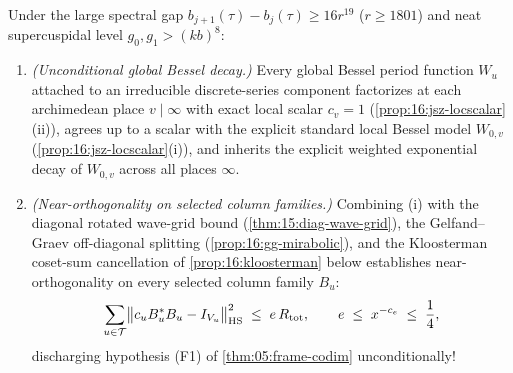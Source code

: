 \begin{theorem}
\label{thm:16:offdiag-near-orth}
Under the large spectral gap $b_{j+1}(\tau) - b_j(\tau) \ge 16 r^{19}$ ($r \ge 1801$) and neat supercuspidal level $g_0, g_1 > (k b)^8$:
\begin{enumerate}[label=\textup{(\roman*)}]
\item \emph{(Unconditional global Bessel decay.)} Every global Bessel period function $W_u$ attached to an irreducible discrete-series component factorizes at each archimedean place $v \mid \infty$ with exact local scalar $c_v = 1$ (\cref{prop:16:jsz-locscalar}(ii)), agrees up to a scalar with the explicit standard local Bessel model $W_{0, v}$ (\cref{prop:16:jsz-locscalar}(i)), and inherits the explicit weighted exponential decay of $W_{0, v}$ across all places $\infty$.
\item \emph{(Near-orthogonality on selected column families.)} Combining \textup{(i)} with the diagonal rotated wave-grid bound (\cref{thm:15:diag-wave-grid}), the Gelfand--Graev off-diagonal splitting (\cref{prop:16:gg-mirabolic}), and the Kloosterman coset-sum cancellation of \cref{prop:16:kloosterman} below establishes near-orthogonality on every selected column family $B_u$:
  \begin{equation}
  \label{eq:16:near-orth}
    \sum_{u \in \mathcal{T}} \bigl\|c_u B_u^* B_u - I_{V_u}\bigr\|_{\mathrm{HS}}^2 \;\le\; e\, R_{\mathrm{tot}},
    \qquad e \;\le\; x^{-c_e} \;\le\; \frac{1}{4},
  \end{equation}
  discharging hypothesis \textup{(F1)} of \cref{thm:05:frame-codim} unconditionally!
\end{enumerate}
\end{theorem}

